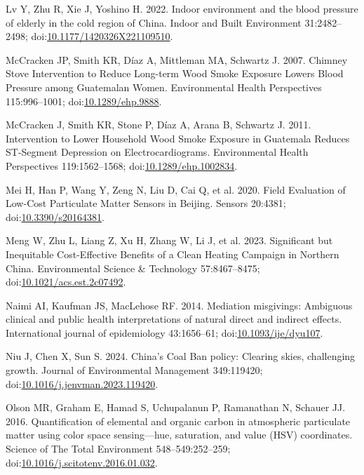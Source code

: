 \documentclass[
  letterpaper,
  DIV=11,
  numbers=noendperiod]{scrartcl}
\newlength{\cslhangindent}
\newlength{\cslentryspacingunit} %
\newenvironment{CSLReferences}[2] %
 {%
  \setlength{\parindent}{0pt}
  \ifodd #1
  \let\oldpar\par
  \def\par{\hangindent=\cslhangindent\oldpar}
  \fi
  \setlength{\parskip}{#2\cslentryspacingunit}
 }%
 {}
\begin{document}
\begin{CSLReferences}{1}{0}
\leavevmode{}%
Lv Y, Zhu R, Xie J, Yoshino H. 2022. Indoor environment and the blood
pressure of elderly in the cold region of {China}. Indoor and Built
Environment 31:2482--2498;
doi:\href{https://doi.org/10.1177/1420326X221109510}{10.1177/1420326X221109510}.

\leavevmode{}%
McCracken JP, Smith KR, Díaz A, Mittleman MA, Schwartz J. 2007. Chimney
{Stove Intervention} to {Reduce Long-term Wood Smoke Exposure Lowers
Blood Pressure} among {Guatemalan Women}. Environmental Health
Perspectives 115:996--1001;
doi:\href{https://doi.org/10.1289/ehp.9888}{10.1289/ehp.9888}.

\leavevmode{}%
McCracken J, Smith KR, Stone P, Díaz A, Arana B, Schwartz J. 2011.
Intervention to {Lower Household Wood Smoke Exposure} in {Guatemala
Reduces ST-Segment Depression} on {Electrocardiograms}. Environmental
Health Perspectives 119:1562--1568;
doi:\href{https://doi.org/10.1289/ehp.1002834}{10.1289/ehp.1002834}.

\leavevmode{}%
Mei H, Han P, Wang Y, Zeng N, Liu D, Cai Q, et al. 2020. Field
{Evaluation} of {Low-Cost Particulate Matter Sensors} in {Beijing}.
Sensors 20:4381;
doi:\href{https://doi.org/10.3390/s20164381}{10.3390/s20164381}.

\leavevmode{}%
Meng W, Zhu L, Liang Z, Xu H, Zhang W, Li J, et al. 2023. Significant
but {Inequitable Cost-Effective Benefits} of a {Clean Heating Campaign}
in {Northern China}. Environmental Science \& Technology 57:8467--8475;
doi:\href{https://doi.org/10.1021/acs.est.2c07492}{10.1021/acs.est.2c07492}.

\leavevmode{}%
Naimi AI, Kaufman JS, MacLehose RF. 2014. Mediation misgivings:
Ambiguous clinical and public health interpretations of natural direct
and indirect effects. International journal of epidemiology 43:1656--61;
doi:\href{https://doi.org/10.1093/ije/dyu107}{10.1093/ije/dyu107}.

\leavevmode{}%
Niu J, Chen X, Sun S. 2024. China's {Coal Ban} policy: {Clearing} skies,
challenging growth. Journal of Environmental Management 349:119420;
doi:\href{https://doi.org/10.1016/j.jenvman.2023.119420}{10.1016/j.jenvman.2023.119420}.

\leavevmode{}%
Olson MR, Graham E, Hamad S, Uchupalanun P, Ramanathan N, Schauer JJ.
2016. Quantification of elemental and organic carbon in atmospheric
particulate matter using color space sensing---hue, saturation, and
value ({HSV}) coordinates. Science of The Total Environment
548--549:252--259;
doi:\href{https://doi.org/10.1016/j.scitotenv.2016.01.032}{10.1016/j.scitotenv.2016.01.032}.


\end{CSLReferences}
\end{document}
